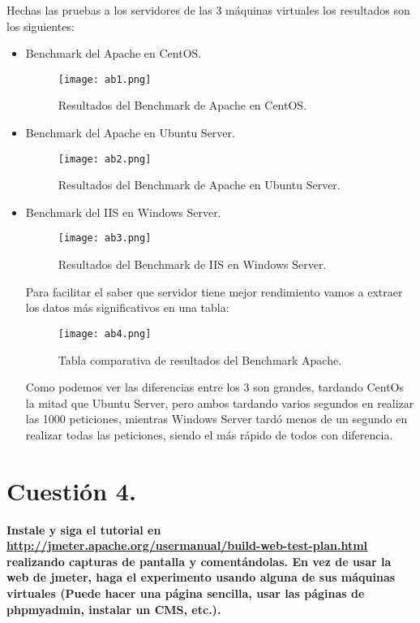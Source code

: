 \documentclass[a4paper, 10pt]{article} %
\begin{document}
\pagebreak

Hechas las pruebas a los servidores de las 3 máquinas virtuales los resultados son los siguientes:

\begin{itemize}
\item Benchmark del Apache en CentOS.

\begin{figure}[H]
\centering 
\texttt{[image: ab1.png]} 
\caption{Resultados del Benchmark de Apache en CentOS.} 
\label{contexto:figura} 
\end{figure}

\pagebreak

\item Benchmark del Apache en Ubuntu Server.

\begin{figure}[H]
\centering 
\texttt{[image: ab2.png]} 
\caption{Resultados del Benchmark de Apache en Ubuntu Server.} 
\label{contexto:figura} 
\end{figure}

\pagebreak

\item Benchmark del IIS en Windows Server.

\begin{figure}[H]
\centering 
\texttt{[image: ab3.png]} 
\caption{Resultados del Benchmark de IIS en Windows Server.} 
\label{contexto:figura} 
\end{figure}

Para facilitar el saber que servidor tiene mejor rendimiento vamos a extraer los datos más significativos en una tabla:

\begin{figure}[H]
\centering 
\texttt{[image: ab4.png]} 
\caption{Tabla comparativa de resultados del Benchmark Apache.} 
\label{contexto:figura} 
\end{figure}

Como podemos ver las diferencias entre los 3 son grandes, tardando CentOs la mitad que Ubuntu Server, pero ambos tardando varios segundos en realizar las 1000 peticiones, mientras Windows Server tardó menos de un segundo en realizar todas las peticiones, siendo el más rápido de todos con diferencia.


\end{itemize}

\pagebreak

\section{Cuestión 4.}
\textbf{Instale y siga el tutorial en \url{http://jmeter.apache.org/usermanual/build-web-test-plan.html} realizando capturas de pantalla y comentándolas. En vez de usar la web de jmeter, haga el experimento usando alguna de sus máquinas virtuales (Puede hacer una página sencilla, usar las páginas de phpmyadmin, instalar un CMS, etc.).}\\
\end{document}
